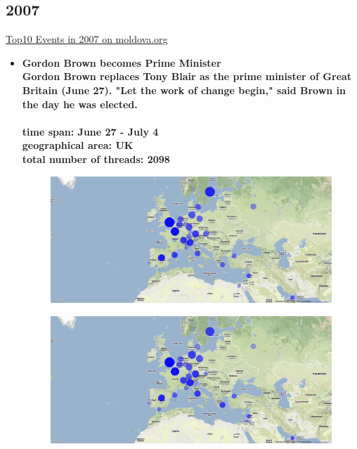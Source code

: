 \documentclass[11pt,a4paper,english]{article}
\begin{document}
			\subsection{2007}
			\href{http://social.moldova.org/news/10-most-important-world-events-of-2007-217388-eng.html}{Top10 Events in 2007 on moldova.org}
				\begin{itemize}
					\item \bf Gordon Brown becomes Prime Minister \rm
						\\ Gordon Brown replaces Tony Blair as the prime minister of Great Britain (June 27). "Let the work of change begin," said Brown in the day he was elected.
						\\\\ \bf time span: \rm June 27 - July 4
						\\ \bf geographical area: \rm UK
						\\ \bf total number of threads: \rm 2098
						\begin{figure}[H]
							\vspace{-5pt}
  							\begin{center}
								\includegraphics[width=130mm]{img/pre-gordon}
							\end{center}
							\vspace{-13pt}
						\end{figure}
						\begin{figure}[H]
							\vspace{-13pt}
	  						\begin{center}
									\includegraphics[width=130mm]{img/post-gordon}

\end{center}
\end{figure}
\end{itemize}
\end{document}
